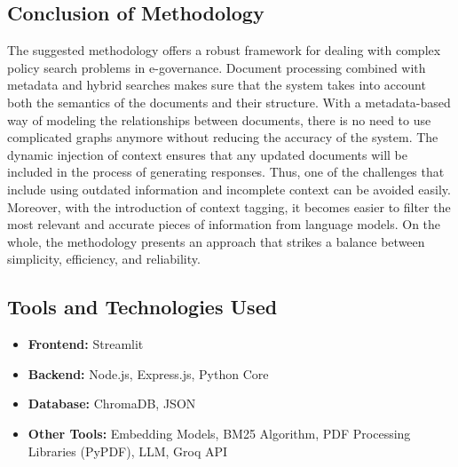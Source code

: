 \documentclass[conference]{IEEEtran}
\begin{document}
\subsection{Conclusion of Methodology}
The suggested methodology offers a robust framework for dealing with complex policy search problems in e-governance. Document processing combined with metadata and hybrid searches makes sure that the system takes into account both the semantics of the documents and their structure. With a metadata-based way of modeling the relationships between documents, there is no need to use complicated graphs anymore without reducing the accuracy of the system. The dynamic injection of context ensures that any updated documents will be included in the process of generating responses. Thus, one of the challenges that include using outdated information and incomplete context can be avoided easily. Moreover, with the introduction of context tagging, it becomes easier to filter the most relevant and accurate pieces of information from language models. On the whole, the methodology presents an approach that strikes a balance between simplicity, efficiency, and reliability.

\subsection{Tools and Technologies Used}
\begin{itemize}
    \item \textbf{Frontend:} Streamlit
    \item \textbf{Backend:} Node.js, Express.js, Python Core
    \item \textbf{Database:} ChromaDB, JSON 
    \item \textbf{Other Tools:} Embedding Models, BM25 Algorithm, PDF Processing Libraries (PyPDF), LLM, Groq API
\end{itemize}
\end{document}
